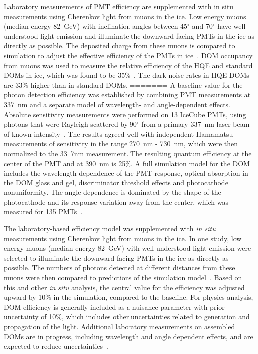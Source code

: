Laboratory measurements of PMT efficiency are supplemented with in situ measurements using Cherenkov light from muons in the ice. Low energy muons (median energy 82~GeV) with inclination angles between 45$^{\circ}$ and 70$^{\circ}$ have well understood light emission and illuminate the downward-facing PMTs in the ice as directly as possible. The deposited charge from these muons is compared to simulation to adjust the effective efficiency of the PMTs in ice~\cite{IC3:ereco}. DOM occupancy from muons was used to measure the relative efficiency of the HQE and standard DOMs in ice, which was found to be 35\%~\cite{ICECUBE:DC}. The dark noise rates in HQE DOMs are 33\% higher than in standard DOMs.
=======
A baseline value for the photon detection efficiency was established
by combining PMT measurements at 337~nm and a separate model of
wavelength- and angle-dependent effects.  Absolute sensitivity
measurements were performed on 13 IceCube PMTs, using photons that
were Rayleigh scattered by 90$^{\circ}$  from a primary 337~nm laser
beam of known intensity~\cite{ICECUBE:PMT}. The results agreed well
with independent Hamamatsu measurements of sensitivity in the range
270~nm - 730~nm, which were then normalized to the 33~7nm measurement.  The resulting quantum efficiency at the center of the PMT and at 390~nm is 25\%.  A full simulation model for the DOM includes the wavelength dependence of the PMT response, optical absorption in the DOM glass and gel, discriminator threshold effects and photocathode nonuniformity.   The angle dependence is dominated by the shape of the photocathode and its response variation away from the center, which was measured for 135 PMTs~\cite{ICECUBE:PMT}.   

The laboratory-based efficiency model was supplemented with \textit{in situ} measurements using Cherenkov light from muons in the ice.  In one study, low energy muons (median energy 82~GeV) with well understood light emission were selected to illuminate the downward-facing PMTs in the ice as directly as possible. The numbers of photons detected at different distances from these muons were then compared to predictions of the simulation model~\cite{IC3:ereco}.  Based on this and other \textit{in situ}  analysis, the central value for the efficiency was adjusted upward by 10\% in the simulation, compared to the baseline.  For physics analysis, DOM efficiency is generally included as a nuisance parameter with prior uncertainty of 10\%,  which includes other uncertainties related to generation and propagation of the light. Additional laboratory measurements on assembled DOMs are in progress, including wavelength and angle dependent effects, and are expected to reduce uncertainties~\cite{ICECUBE:DOMEFF}.

